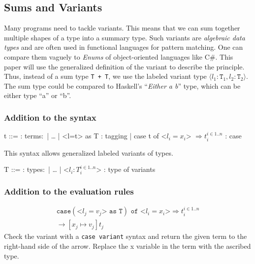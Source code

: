 \subsection{Sums and Variants}
\label{subsec:variants}

Many programs need to tackle variants. This means
that we can sum together multiple shapes of a type into a summary
type. Such variants are \textit{algebraic data types} and are often used in functional
languages for pattern matching. One can compare them vaguely to \textit{Enums} of
object-oriented languages like C\#.
This paper will use the generalized definition
of the variant to describe the principle. Thus, instead of a sum type \texttt{T + T},
we use the labeled variant type $\langle l_1 \colon \texttt{T}_1, l_2 \colon \texttt{T}_2 \rangle$.
The sum type could be compared to Haskell's ``\textit{Either a b}'' type, which can be
either type ``a'' or ``b''.

\subsubsection{Addition to the syntax \cite{pierce2002ProgLang}}
\begin{bnfgrammar}
    t ::= : terms$\colon$
    | \dots
    | <l=t> as T : tagging
    | case t of <$l_i=x_i$> $\Rightarrow t_i^{i \in 1..n}$ : case
\end{bnfgrammar}\leavevmode\newline
This syntax allows generalized labeled variants of types.

\begin{bnfgrammar}
    T ::= : types$\colon$
    | \dots
    | <$l_i \colon T_i^{i \in 1..n}$> : type of variants
\end{bnfgrammar}\leavevmode\newline

\subsubsection{Addition to the evaluation rules \cite{pierce2002ProgLang}}
\begin{equation*}
    \tag{Case variant}
    \begin{split}
        \texttt{case} (\text{<}l_j=v_j\text{>} \texttt{ as } \texttt{T}) \texttt{ of } \text{<}l_i=x_i\text{>} \Rightarrow t_i^{i \in 1..n} \\
        \rightarrow [x_j \mapsto v_j]t_j
    \end{split}
\end{equation*}
Check the variant with a \texttt{case variant} syntax and return
the given term to the right-hand side of the arrow. Replace the
x variable in the term with the ascribed type.

